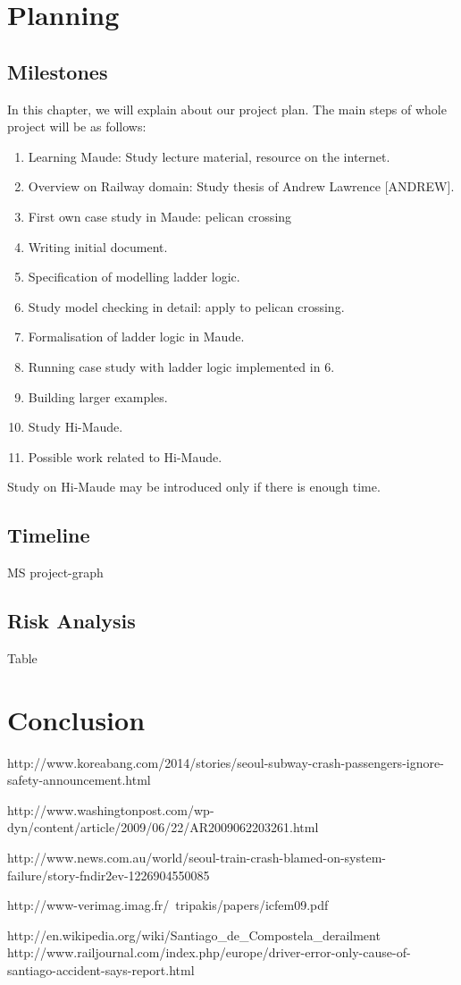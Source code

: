 \documentclass{report}
\begin{document}
\newpage
\chapter{Planning}
\section{Milestones}
In this chapter, we will explain about our project plan. The main steps of whole project will be as follows:
\begin{enumerate}
  \item Learning Maude: Study lecture material, resource on the internet.
  \item Overview on Railway domain: Study thesis of Andrew Lawrence [ANDREW]. 
  \item First own case study in Maude: pelican crossing
	\item Writing initial document.
	\item Specification of modelling ladder logic.
	\item Study model checking in detail: apply to pelican crossing.
	\item Formalisation of ladder logic in Maude.
	\item Running case study with ladder logic implemented in $6$.
	\item Building larger examples.
	\item Study Hi-Maude.
	\item Possible work related to Hi-Maude.
\end{enumerate}
Study on Hi-Maude may be introduced only if there is enough time.  
\section{Timeline}
MS project-graph
\section{Risk Analysis}
Table
\chapter{Conclusion}
http://www.koreabang.com/2014/stories/seoul-subway-crash-passengers-ignore-safety-announcement.html

http://www.washingtonpost.com/wp-dyn/content/article/2009/06/22/AR2009062203261.html

http://www.news.com.au/world/seoul-train-crash-blamed-on-system-failure/story-fndir2ev-1226904550085

http://www-verimag.imag.fr/~tripakis/papers/icfem09.pdf

http://en.wikipedia.org/wiki/Santiago_de_Compostela_derailment
http://www.railjournal.com/index.php/europe/driver-error-only-cause-of-santiago-accident-says-report.html
\end{document}
